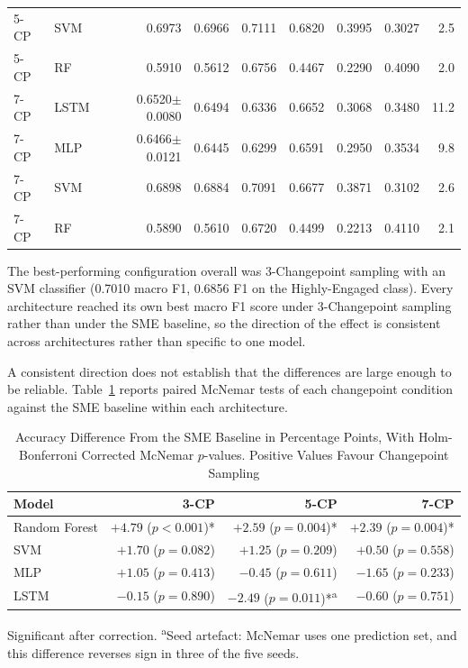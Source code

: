 \documentclass[11pt,a4paper]{article}
\begin{document}
\begin{table}[h]
\begin{tabular}{llrrrrrrr}
5-CP & SVM & 0.6973 & 0.6966 & 0.7111 & 0.6820 & 0.3995 & 0.3027 & 2.5 \\
5-CP & RF & 0.5910 & 0.5612 & 0.6756 & 0.4467 & 0.2290 & 0.4090 & 2.0 \\
7-CP & LSTM & 0.6520$\pm$0.0080 & 0.6494 & 0.6336 & 0.6652 & 0.3068 & 0.3480 & 11.2 \\
7-CP & MLP & 0.6466$\pm$0.0121 & 0.6445 & 0.6299 & 0.6591 & 0.2950 & 0.3534 & 9.8 \\
7-CP & SVM & 0.6898 & 0.6884 & 0.7091 & 0.6677 & 0.3871 & 0.3102 & 2.6 \\
7-CP & RF & 0.5890 & 0.5610 & 0.6720 & 0.4499 & 0.2213 & 0.4110 & 2.1 \\
\bottomrule
\end{tabular}
\end{table}

The best-performing configuration overall was 3-Changepoint sampling with an SVM classifier (0.7010 macro F1, 0.6856 F1 on the Highly-Engaged class). Every architecture reached its own best macro F1 score under 3-Changepoint sampling rather than under the SME baseline, so the direction of the effect is consistent across architectures rather than specific to one model.

A consistent direction does not establish that the differences are large enough to be reliable. Table~\ref{tab:signif} reports paired McNemar tests of each changepoint condition against the SME baseline within each architecture.

\begin{table}[h]
\caption{Accuracy Difference From the SME Baseline in Percentage Points, With Holm-Bonferroni Corrected McNemar $p$-values. Positive Values Favour Changepoint Sampling}
\label{tab:signif}
\centering
\begin{tabular}{lrrr}
\toprule
Model & 3-CP & 5-CP & 7-CP \\
\midrule
Random Forest & $+4.79$ ($p<0.001$)* & $+2.59$ ($p=0.004$)* & $+2.39$ ($p=0.004$)* \\
SVM & $+1.70$ ($p=0.082$) & $+1.25$ ($p=0.209$) & $+0.50$ ($p=0.558$) \\
MLP & $+1.05$ ($p=0.413$) & $-0.45$ ($p=0.611$) & $-1.65$ ($p=0.233$) \\
LSTM & $-0.15$ ($p=0.890$) & $-2.49$ ($p=0.011$)*\textsuperscript{a} & $-0.60$ ($p=0.751$) \\
\bottomrule
\end{tabular}

\vspace{0.15cm}
{\fontsize{9}{10}\selectfont * Significant after correction. \textsuperscript{a}Seed artefact: McNemar uses one prediction set, and this difference reverses sign in three of the five seeds.}
\end{table}
\end{document}
